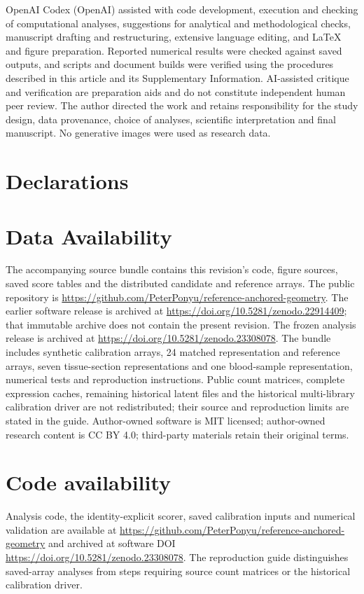 \documentclass[11pt]{article}
\begin{document}
OpenAI Codex (OpenAI) assisted with code development, execution and checking of computational analyses, suggestions for analytical and methodological checks, manuscript drafting and restructuring, extensive language editing, and LaTeX and figure preparation. Reported numerical results were checked against saved outputs, and scripts and document builds were verified using the procedures described in this article and its Supplementary Information. AI-assisted critique and verification are preparation aids and do not constitute independent human peer review. The author directed the work and retains responsibility for the study design, data provenance, choice of analyses, scientific interpretation and final manuscript. No generative images were used as research data.

\section{Declarations}

\section*{Data Availability}
The accompanying source bundle contains this revision's code, figure sources, saved score tables and the distributed candidate and reference arrays. The public repository is \url{https://github.com/PeterPonyu/reference-anchored-geometry}. The earlier software release is archived at \url{https://doi.org/10.5281/zenodo.22914409}; that immutable archive does not contain the present revision. The frozen analysis release is archived at \url{https://doi.org/10.5281/zenodo.23308078}. The bundle includes synthetic calibration arrays, 24 matched representation and reference arrays, seven tissue-section representations and one blood-sample representation, numerical tests and reproduction instructions. Public count matrices, complete expression caches, remaining historical latent files and the historical multi-library calibration driver are not redistributed; their source and reproduction limits are stated in the guide. Author-owned software is MIT licensed; author-owned research content is CC BY 4.0; third-party materials retain their original terms.

\section*{Code availability}
Analysis code, the identity-explicit scorer, saved calibration inputs and numerical validation are available at \url{https://github.com/PeterPonyu/reference-anchored-geometry} and archived at software DOI \url{https://doi.org/10.5281/zenodo.23308078}. The reproduction guide distinguishes saved-array analyses from steps requiring source count matrices or the historical calibration driver.
\end{document}
